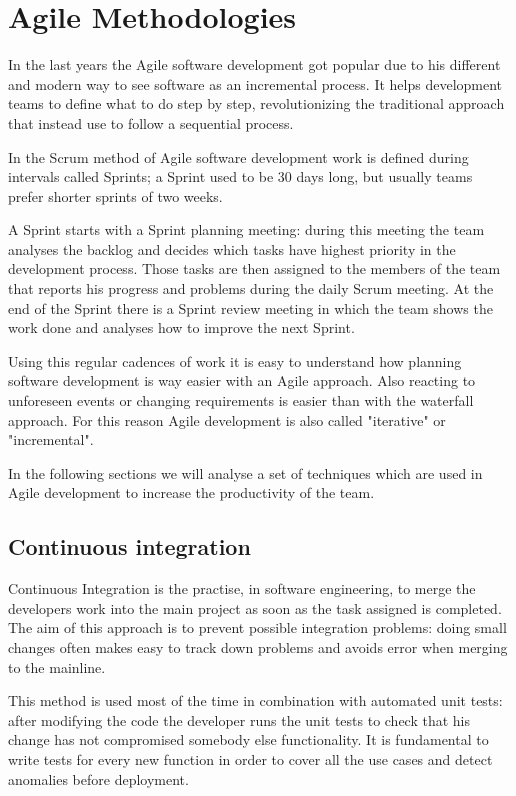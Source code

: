 \section{Agile Methodologies}

In the last years the Agile software development got popular due to his
different and modern way to see software as an incremental process. It
helps development teams to define what to do step by step, revolutionizing
the traditional approach that instead use to follow a sequential process.

In the Scrum method of Agile software development work is defined during
intervals called Sprints; a Sprint used to be 30 days long, but usually
teams prefer shorter sprints of two weeks.

A Sprint starts with a Sprint planning meeting: during this meeting the team
analyses the backlog and decides which tasks have highest priority in the
development process. Those tasks are then assigned to the members of the team
that reports his progress and problems during the daily Scrum meeting. At the
end of the Sprint there is a Sprint review meeting in which the team shows the
work done and analyses how to improve the next Sprint.

Using this regular cadences of work it is easy to understand how planning
software development is way easier with an Agile approach. Also reacting to
unforeseen events or changing requirements is easier than with the waterfall
approach. For this reason Agile development is also called "iterative" or
"incremental".

In the following sections we will analyse a set of techniques which are used in
Agile development to increase the productivity of the team.

\subsection{Continuous integration}

Continuous Integration is the practise, in software engineering, to merge
the developers work into the main project as soon as the task assigned is
completed. The aim of this approach is to prevent possible integration
problems: doing small changes often makes easy to track down problems and
avoids error when merging to the mainline.

This method is used most of the time in combination with automated unit tests:
after modifying the code the developer runs the unit tests to check that his
change has not compromised somebody else functionality. It is fundamental to
write tests for every new function in order to cover all the use cases and
detect anomalies before deployment.

